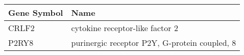 \begin{tabular}{ll}
\toprule
Gene Symbol &                                          Name \\
\midrule
      CRLF2 &               cytokine receptor-like factor 2 \\
      P2RY8 & purinergic receptor P2Y, G-protein coupled, 8 \\
\bottomrule
\end{tabular}

